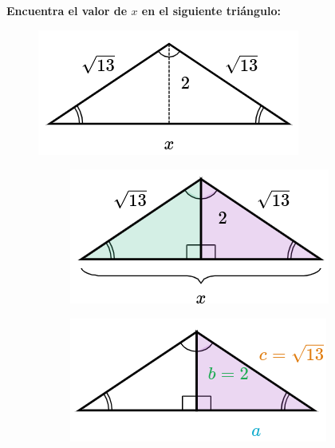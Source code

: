 \begin{multicols}{2}
    \textbf{Encuentra el valor de $x$ en el siguiente triángulo:}

    \begin{figure}[H]
        \centering
        \includegraphics[width=0.45\linewidth]{../images/pitagoras10.png}
    \end{figure}
\end{multicols}\vspace{-0.5cm}

\begin{solutionbox}{10.5cm}\footnotesize
    \vspace{-0.5cm}
    \captionsetup[figure]{size=scriptsize,justification=centering}
    \begin{figure}[H]
        \centering
        \captionsetup[subfigure]{size=scriptsize}
        \begin{subfigure}{0.22\linewidth}
            \includegraphics[width=0.9\linewidth]{../images/pitagoras10a.png}
            \caption{}
            \label{subfig:pitagoras10a}
        \end{subfigure}
        \begin{subfigure}{0.22\linewidth}
            \includegraphics[width=0.9\linewidth]{../images/pitagoras10b.png}

\end{subfigure}
\end{figure}
\end{solutionbox}
